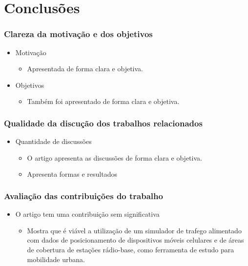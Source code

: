 \documentclass{beamer}
\begin{document}
\section{Conclusões} 

\begin{frame}
	\frametitle{Clareza da motivação e dos objetivos}
	\begin{itemize}
		\item Motivação
		\begin{itemize}
			\item Apresentada de forma clara e objetiva.
		\end{itemize}
		\item Objetivos
		\begin{itemize}
			\item Também foi apresentado de forma clara e objetiva.
		\end{itemize}
	\end{itemize}
\end{frame}


\begin{frame}
	\frametitle{Qualidade da discução dos trabalhos relacionados}
	\begin{itemize}
		\item Quantidade de discussões
		\begin{itemize}
			\item O artigo apresenta as discussões de forma clara e objetiva.
			\item Apresenta formas e resultados
		\end{itemize}
	\end{itemize}
\end{frame}


\begin{frame}
	\frametitle{Avaliação das contribuições do trabalho}
	\begin{itemize}
		\item O artigo tem uma contribuição sem significativa
		\begin{itemize}
			\item Mostra que é viável a utilização de um simulador de trafego alimentado com dados de posicionamento de dispositivos móveis celulares e de áreas de cobertura de estações rádio-base, como ferramenta de estudo para mobilidade urbana.
		\end{itemize}
	\end{itemize}
\end{frame}


\begin{frame}
\titlepage %
\end{frame}

\end{document}
